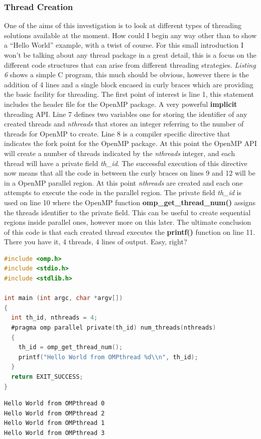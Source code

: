 \documentclass[11pt]{article} %
\begin{document}
\subsubsection{Thread Creation}
One of the aims of this investigation is to look at different types of threading solutions available at the moment. How could I begin any way other than to show a ``Hello World'' example, with a twist of course. For this small introduction I won't be talking about any thread package in a great detail, this is a focus on the different code structures that can arise from different threading strategies. {\it Listing 6} shows a simple C program, this much should be obvious, however there is the addition of 4 lines and a single block encased in curly braces which are providing the basic facility for threading. The first point of interest is line 1, this statement includes the header file for the OpenMP package. A very powerful {\bf implicit} threading API. Line 7 defines two variables one for storing the identifier of any created threads and {\it nthreads} that stores an integer referring to the number of threads for OpenMP to create. Line 8 is a compiler specific directive that indicates the fork point for the OpenMP package. At this point the OpenMP API will create a number of threads indicated by the {\it nthreads} integer, and each thread will have a private field {\it th\_id}. The successful execution of this directive now means that all the code in between the curly braces on lines 9 and 12 will be in a OpenMP parallel region. At this point {\it nthreads} are created and each one attempts to execute the code in the parallel region. The private field {\it th\_id} is used on line 10 where the OpenMP function {\bf omp\_get\_thread\_num()} assigns the threads identifier to the private field. This can be useful to create sequential regions inside parallel ones, however more on this later. The ultimate conclusion of this code is that each created thread executes the {\bf printf()} function on line 11. There you have it, 4 threads, 4 lines of output. Easy, right?
\begin{lstlisting}[language=C, caption={Hello World from OpenMP}]
#include <omp.h>
#include <stdio.h>
#include <stdlib.h>
 
int main (int argc, char *argv[])
{
  int th_id, nthreads = 4;
  #pragma omp parallel private(th_id) num_threads(nthreads)
  {
    th_id = omp_get_thread_num();
    printf("Hello World from OMPthread %d\\n", th_id);
  }
  return EXIT_SUCCESS;
}
\end{lstlisting}
\begin{verbatim}
Hello World from OMPthread 0
Hello World from OMPthread 2
Hello World from OMPthread 1
Hello World from OMPthread 3
\end{verbatim}
\end{document}
